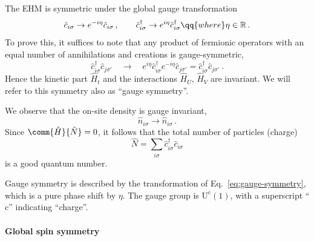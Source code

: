 The EHM is symmetric under the global gauge transformation
\begin{equation}\label{eq:gauge-symmetry}
	\hat c_{i\sigma} \to e^{-i\eta} \hat c_{i\sigma} \, ,
	\qquad
	\hat c_{i\sigma}^\dagger \to e^{i\eta} \hat c_{i\sigma}^\dagger
	\qq{where}
	\eta \in \mathbb{R} \, .
\end{equation}
To prove this, it suffices to note that any product of fermionic operators with an equal number of annihilations and creations is gauge-symmetric,
\begin{equation}\label{eq:gauge-symmetry-c+c-}
	\hat c_{i\sigma}^\dagger \hat c_{j\sigma'}
	\quad\to\quad
	e^{i\eta} \hat c_{i\sigma}^\dagger e^{-i\eta} \hat c_{j\sigma'} = \hat c_{i\sigma}^\dagger \hat c_{j\sigma'} \, .
\end{equation}
Hence the kinetic part $\hat H_t$ and the interactions $\hat H_U$, $\hat H_V$ are invariant. We will refer to this symmetry also as ``gauge symmetry''.

We observe that the on-site density is gauge invariant,
\begin{equation}\label{eq:ehm-n-gauge}
	\hat n_{i\sigma} \to \hat n_{i\sigma} \, .
\end{equation}
Since $\comm{\hat H}{\hat N} = 0$, it follows that the total number of particles (charge)
\[
	\hat{N} = \sum_{i\sigma} \hat c_{i\sigma}^\dagger \hat c_{i\sigma}
\]
is a good quantum number. 

Gauge symmetry is described by the transformation of Eq.~\eqref{eq:gauge-symmetry}, which is a pure phase shift by $\eta$. The gauge group is $\mathrm{U}^\mathrm{c}(1)$, with a superscript ``$\mathrm{c}$'' indicating ``charge''.

\paragraph{Global spin symmetry}

